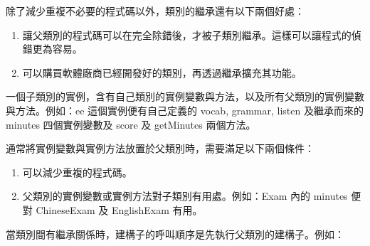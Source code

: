 \documentclass[a4paper,12pt,english]{sphinxmanual}
\begin{document}
除了減少重複不必要的程式碼以外，類別的繼承還有以下兩個好處：
\begin{enumerate}
\item {} 
讓父類別的程式碼可以在完全除錯後，才被子類別繼承。這樣可以讓程式的偵錯更為容易。

\item {} 
可以購買軟體廠商已經開發好的類別，再透過繼承擴充其功能。

\end{enumerate}

一個子類別的實例，含有自己類別的實例變數與方法，以及所有父類別的實例變數與方法。例如：ee 這個實例便有自己定義的 vocab, grammar, listen 及繼承而來的 minutes 四個實例變數及 score 及 getMinutes 兩個方法。

通常將實例變數與實例方法放置於父類別時，需要滿足以下兩個條件：
\begin{enumerate}
\item {} 
可以減少重複的程式碼。

\item {} 
父類別的實例變數或實例方法對子類別有用處。例如：Exam 內的 minutes 便對 ChineseExam 及 EnglishExam 有用。

\end{enumerate}

當類別間有繼承關係時，建構子的呼叫順序是先執行父類別的建構子。例如：
\end{document}
